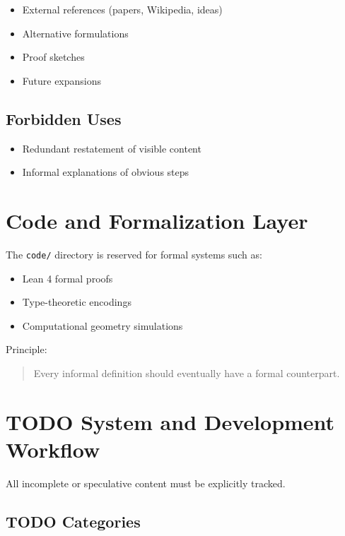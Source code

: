 \documentclass{book}
\begin{document}
\begin{itemize}
    \item External references (papers, Wikipedia, ideas)
    \item Alternative formulations
    \item Proof sketches
    \item Future expansions
\end{itemize}

\subsection{Forbidden Uses}

\begin{itemize}
    \item Redundant restatement of visible content
    \item Informal explanations of obvious steps
\end{itemize}

\section{Code and Formalization Layer}

The \texttt{code/} directory is reserved for formal systems such as:

\begin{itemize}
    \item Lean 4 formal proofs
    \item Type-theoretic encodings
    \item Computational geometry simulations
\end{itemize}

Principle:

\begin{quote}
Every informal definition should eventually have a formal counterpart.
\end{quote}

\section{TODO System and Development Workflow}

All incomplete or speculative content must be explicitly tracked.

\subsection{TODO Categories}
\end{document}
